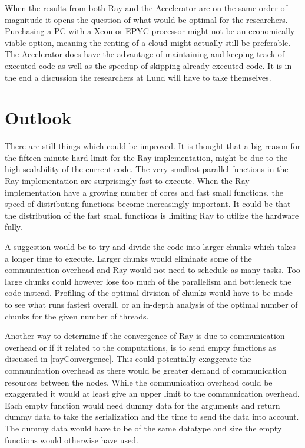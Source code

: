 \documentclass[12pt, a4paper]{article}
\begin{document}
When the results from both Ray and the Accelerator are on the same order of magnitude it opens the question of what would be optimal for the researchers.
Purchasing a PC with a Xeon or EPYC processor might not be an economically viable option, meaning the renting of a cloud might actually still be preferable.
The Accelerator does have the advantage of maintaining and keeping track of executed code as well as the speedup of skipping already executed code.
It is in the end a discussion the researchers at Lund will have to take themselves.


\section{Outlook}

There are still things which could be improved.
It is thought that a big reason for the fifteen minute hard limit for the Ray implementation, might be due to the high scalability of the current code.
The very smallest parallel functions in the Ray implementation are surprisingly fast to execute.
When the Ray implementation have a growing number of cores and fast small functions, the speed of distributing functions become increasingly important.
It could be that the distribution of the fast small functions is limiting Ray to utilize the hardware fully.

A suggestion would be to try and divide the code into larger chunks which takes a longer time to execute.
Larger chunks would eliminate some of the communication overhead and Ray would not need to schedule as many tasks.
Too large chunks could however lose too much of the parallelism and bottleneck the code instead.
Profiling of the optimal division of chunks would have to be made to see what runs fastest overall, or an in-depth analysis of the optimal number of chunks for the given number of threads.

Another way to determine if the convergence of Ray is due to communication overhead or if it related to the computations, is to send empty functions as discussed in \cref{rayConvergence}.
This could potentially exaggerate the communication overhead as there would be greater demand of communication resources between the nodes.
While the communication overhead could be exaggerated it would at least give an upper limit to the communication overhead.
Each empty function would need dummy data for the arguments and return dummy data to take the serialization and the time to send the data into account.
The dummy data would have to be of the same datatype and size the empty functions would otherwise have used.
\end{document}
